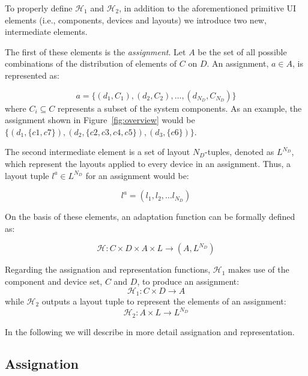 To properly define $\mathcal{H}_1$ and $\mathcal{H}_2$, in addition to the aforementioned primitive UI elements (i.e., components, devices and layouts) we introduce two new, intermediate elements.

The first of these elements is the \emph{assignment}. 
Let $A$ be the set of all possible combinations of the distribution of elements of $C$ on $D$. 
An assignment, $a \in A$, is represented as:

\begin{equation}
a = \{(d_1, C_1), (d_2, C_2), \ldots, (d_{N_D}, C_{N_D}) \}
\end{equation}
where $C_i \subseteq C$ represents a subset of the system components. As an example, the assignment shown in Figure~\ref{fig:overview} would be $\{(d_1, \{c1, c7\}), (d_2, \{c2, c3, c4, c5\}), (d_3, \{c6\})\}$. 

The second intermediate element is a set of layout $N_D$-tuples, denoted as $L^{N_D}$, which represent the layouts applied to every device in an assignment. 
Thus, a layout tuple $l^a \in L^{N_D}$ for an assignment would be:

\begin{equation}
l^a = (l_1, l_2, \ldots l_{N_D})
\end{equation}

On the basis of these elements, an adaptation function can be formally defined as:

\begin{equation}
\mathcal{H}:C \times D \times A \times L \to (A, L^{N_D}) 
\end{equation}

Regarding the assignation and representation functions, $\mathcal{H}_1$ makes use of the component and device set, $C$ and $D$, to produce an assignment:
\begin{equation} 
\mathcal{H}_1: C \times D \to A
\end{equation}
while $\mathcal{H}_2$ outputs a layout tuple to represent the elements of an assignment: 
\begin{equation}
\mathcal{H}_2: A \times L \to L^{N_D}
\end{equation}


In the following we will describe in more detail assignation and representation.


\subsection{Assignation} \label{s1}

